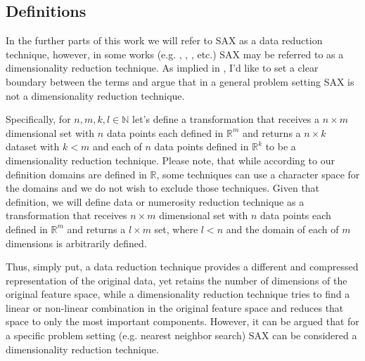 \documentclass{article}
\begin{document}
\subsection{Definitions}
In the further parts of this work we will refer to SAX as a data reduction technique, however, in some works (e.g. \cite{keogh2001dimensionality}, \cite{lin2007experiencing}, \cite{shieh2008sax}, etc.) SAX may be referred to as a dimensionality reduction technique. As implied in \cite{xi2006fast}, I'd like to set a clear boundary between the terms and argue that in a general problem setting SAX is not a dimensionality reduction technique. \par
Specifically, for $n,m,k,l \in \mathbb{N}$ let's define a transformation that receives a $n \times m$ dimensional set with $n$ data points each defined in $\mathbb{R}^m$ and returns a $n \times k$ dataset with $k < m$ and each of $n$ data points defined in $\mathbb{R}^k$ to be a dimensionality reduction technique. Please note, that while according to our definition domains are defined in $\mathbb{R}$, some techniques can use a character space for the domains and we do not wish to exclude those techniques. Given that definition, we will define data or numerosity reduction technique as a transformation that receives $n \times m$ dimensional set with $n$ data points each defined in $\mathbb{R}^m$ and returns a $l \times m$ set, where $l < n$ and the domain of each of $m$ dimensions is arbitrarily defined. \par
Thus, simply put, a data reduction technique provides a different and compressed representation of the original data, yet retains the number of dimensions of the original feature space, while a dimensionality reduction technique tries to find a linear or non-linear combination in the original feature space and reduces that space to only the most important components. However, it can be argued that for a specific problem setting (e.g. nearest neighbor search) SAX can be considered a dimensionality reduction technique.
\end{document}
